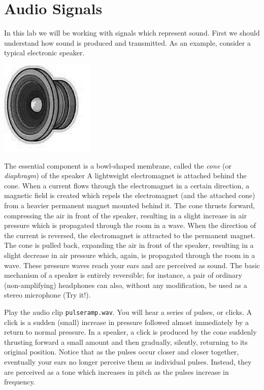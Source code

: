 \def\x{{\bf x}}
\def\q{{\bf q}}
\def\p{{\bf p}}
\def\v{{\bf v}}


\section*{Audio Signals}

In this lab we will be working with signals which represent sound.
First we should understand how sound is produced and transmitted.
As an example, consider a typical electronic speaker.

\begin{center}\includegraphics[width=45mm]{speaker}\end{center}
The essential component is a bowl-shaped membrane, called the \emph{cone} (or \emph{diaphragm}) of the speaker
A lightweight electromagnet is attached behind the cone.
When a current flows through the electromagnet in a certain direction, a magnetic field is created which repels the electromagnet (and the attached cone) from a heavier permanent magnet mounted behind it.
The cone thrusts forward, compressing the air in front of the speaker, resulting in a slight increase in air pressure which is propagated through the room in a wave.
When the direction of the current is reversed, the electromagnet is attracted to the permanent magnet.
The cone is pulled back, expanding the air in front of the speaker, resulting in a slight decrease in air pressure which, again, is propagated through the room in a wave.
These pressure waves reach your ears and are perceived as sound.
The basic mechanism of a speaker is entirely reversible; for instance, a pair of ordinary (non-amplifying) headphones can also, without any modification, be used as a stereo microphone (Try it!).


Play the audio clip \texttt{pulseramp.wav}.
You will hear a series of pulses, or clicks.
A click is a sudden (small) increase in pressure followed almost immediately by a return to normal pressure.
In a speaker, a click is produced by the cone suddenly thrusting forward a small amount and then gradually, silently, returning to its original position.
Notice that as the pulses occur closer and closer together, eventually your ears no longer perceive them as individual pulses.
Instead, they are perceived as a tone which increases in pitch as the pulses increase in frequency.

